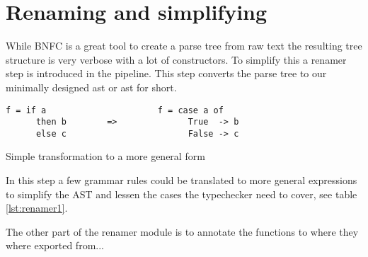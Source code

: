 \section{Renaming and simplifying}
While BNFC is a great tool to create a parse tree from raw text the resulting 
tree structure is very verbose with a lot of constructors. To simplify this a
renamer step is introduced in the pipeline. This step converts the parse tree
to our minimally designed \acrlong{ast} or \acrshort{ast} for short. 

\begin{table}
\begin{lstlisting} 
f = if a                      f = case a of
      then b        =>              True  -> b
      else c                        False -> c
\end{lstlisting}
\caption{Simple transformation to a more general form}
\label{lst:renamer1}
\end{table}

In this step a few grammar rules could be translated to more general expressions
to simplify the AST and lessen the cases the typechecker need to cover, see
table \ref{lst:renamer1}.

The other part of the renamer module is to annotate the functions to where they
where exported from...
